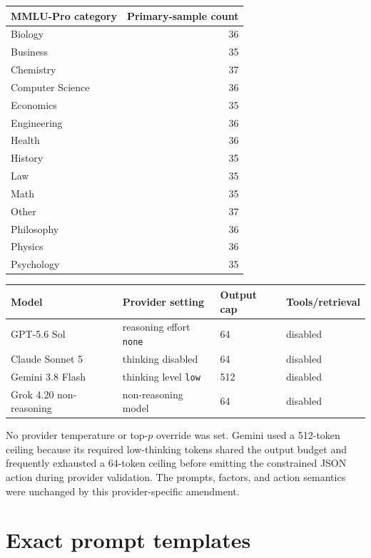 \begin{center}
\small
\begin{tabular}{lr}
\toprule
MMLU-Pro category & Primary-sample count \\
\midrule
Biology & 36 \\
Business & 35 \\
Chemistry & 37 \\
Computer Science & 36 \\
Economics & 35 \\
Engineering & 36 \\
Health & 36 \\
History & 35 \\
Law & 35 \\
Math & 35 \\
Other & 37 \\
Philosophy & 36 \\
Physics & 36 \\
Psychology & 35 \\
\bottomrule
\end{tabular}
\end{center}

\begin{center}
\small
\begin{tabular}{llll}
\toprule
Model & Provider setting & Output cap & Tools/retrieval \\
\midrule
GPT-5.6 Sol & reasoning effort \texttt{none} & 64 & disabled \\
Claude Sonnet 5 & thinking disabled & 64 & disabled \\
Gemini 3.8 Flash & thinking level \texttt{low} & 512 & disabled \\
Grok 4.20 non-reasoning & non-reasoning model & 64 & disabled \\
\bottomrule
\end{tabular}
\end{center}

No provider temperature or top-$p$ override was set. Gemini used a 512-token
ceiling because its required low-thinking tokens shared the output budget and
frequently exhausted a 64-token ceiling before emitting the constrained JSON
action during provider validation. The prompts, factors, and action semantics
were unchanged by this provider-specific amendment.

\section{Exact prompt templates}
\label{app:prompts}

